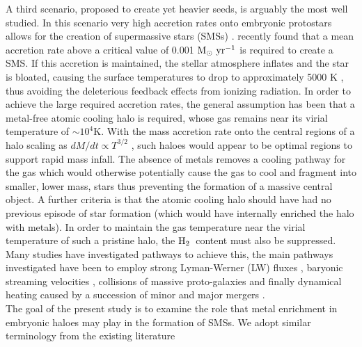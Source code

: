 \documentclass[twocolumn,iop,revtex4]{openjournal}
\newcommand{\msolaryr} {$\rm{M_{\odot}~yr^{-1}}~$}
\newcommand{\molH} {$\rm{H_2}$~}
\begin{document}
\indent A third scenario, proposed to create yet heavier seeds, is arguably the most well studied.
In this scenario very high accretion rates onto embryonic protostars allows for the creation of supermassive stars (SMSs)
\citep{Shapiro_1979, Begelman_2008, Schleicher_2013, Hosokawa_2013, Inayoshi_2014, Sakurai_2016,
  Umeda_2016, Haemmerle_2018,Woods_2017, Woods_2018, Regan_2018b}. \cite{Haemmerle_2018} recently found
that a mean accretion rate above a critical value of 0.001 \msolaryr is required to create a SMS.
If this accretion is maintained, the stellar atmosphere inflates and the star is bloated,
causing the surface temperatures to drop to approximately 5000 K \citep{Hosokawa_2013, Woods_2017, Haemmerle_2018},
thus avoiding the deleterious feedback effects from ionizing radiation.
In order to achieve the large required accretion rates, the general assumption has been
that a metal-free atomic cooling halo is required, whose gas remains near its virial temperature of $\sim10^4$K.
With the mass accretion rate onto the central regions of a halo scaling as $dM/dt \propto T^{3/2}$ \citep{Shu_1977}, such haloes would appear
to be optimal regions to support rapid mass infall. The absence of metals removes a cooling pathway for
the gas which would otherwise potentially cause the gas to cool and fragment into smaller, lower
mass, stars thus preventing the formation of a massive central object. A further criteria is that the
atomic cooling halo should have had no previous episode of star formation (which would have
internally enriched the halo with metals). In order to maintain the gas temperature near the virial temperature of such a pristine halo, the \molH content
must also be suppressed. Many studies have investigated pathways to achieve this, the main pathways
investigated have been to employ strong Lyman-Werner (LW) fluxes \citep{Dijkstra_2008, Shang_2010,
  Regan_2014b, Latif_2014b, Agarwal_2015a, Latif_2015, Regan_2016a, Regan_2017, Regan_2018a},
baryonic streaming velocities
\citep{Tseliakhovich_2010, Tanaka_2014, Hirano_2017, Schauer_2017}, collisions of massive
proto-galaxies \citep{Mayer_2010, Mayer_2014, Inayoshi_2015} and finally dynamical heating caused
by a succession of minor and major mergers \citep{Yoshida_2003a, Fernandez_2014, Wise_2019}. \\
\indent The goal of the present study is to examine the role that metal enrichment in embryonic
haloes may play in the
formation of SMSs. We adopt similar terminology from the existing literature
\end{document}

